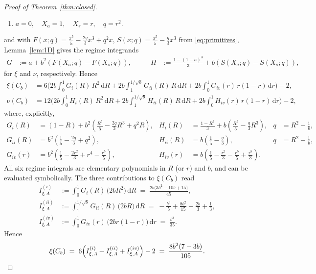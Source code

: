\documentclass{article}
\newcommand{\1}{\mathds{1}}
\newcommand{\de}{\mathrm{\,d}}
\begin{document}
\begin{proof}[Proof of Theorem~\ref{thm:closed}]
\begin{enumerate}[label=(\roman*)]
\item[(iv)] \(a = 0,\quad X_a = 1,\quad X_s = r,\quad q = r^{2}.\)
\end{enumerate}
and with \(F(x;q)=\frac{x^5}{5}-\frac{2q}{3}x^3+q^2x\), \(S(x;q)=\frac{x^5}{5}-\frac{q}{3}x^3\) from \eqref{eq:primitives}, Lemma~\ref{lem:1D} gives the regime integrands
\[
\begin{aligned}
G &:= a + b^2\!\left(F(X_a;q)-F(X_s;q)\right),
&\qquad
H &:= \frac{1-(1-a)^3}{3} + b\!\left(S(X_a;q)-S(X_s;q)\right),
\end{aligned}
\]
for \(\xi\) and \(\nu\), respectively. Hence
\[
\begin{aligned}
\xi(C_b)
&= 6\Bigg(
   2b\!\int_{0}^{1}\! G_i(R)\,R^2\de R
 + 2b\!\int_{1}^{1/\sqrt b}\! G_{ii}(R)\,R\de R
 + 2b\!\int_{0}^{1}\! G_{iv}(r)\,r(1-r)\de r
\Bigg) - 2,\\[4pt]
\nu(C_b)
&= 12\Bigg(
   2b\!\int_{0}^{1}\! H_i(R)\,R^2\de R
 + 2b\!\int_{1}^{1/\sqrt b}\! H_{ii}(R)\,R\de R
 + 2b\!\int_{0}^{1}\! H_{iv}(r)\,r(1-r)\de r
\Bigg) - 2,
\end{aligned}
\]
where, explicitly,
\[
\begin{aligned}
G_i(R)&=(1-R)+b^2\!\left(\frac{R^5}{5}-\frac{2q}{3}R^3+q^2R\right)\!,
& H_i(R)&=\frac{1-R^3}{3}+b\!\left(\frac{R^5}{5}-\frac{q}{3}R^3\right)\!,
& q&=R^2-\tfrac{1}{b},\\[3pt]
G_{ii}(R)&=b^2\!\left(\frac{1}{5}-\frac{2q}{3}+q^2\right)\!,
& H_{ii}(R)&=b\!\left(\frac{1}{5}-\frac{q}{3}\right)\!,
& q&=R^2-\tfrac{1}{b},\\[3pt]
G_{iv}(r)&=b^2\!\left(\frac{1}{5}-\frac{2r^2}{3}+r^4 - \frac{r^5}{5}\right)\!,
& H_{iv}(r)&=b\!\left(\frac{1}{5}-\frac{r^2}{3} - \frac{r^5}{5} + \frac{r^5}{3}\right)\!.
\end{aligned}
\]
All six regime integrals are elementary polynomials in \(R\) (or \(r\)) and \(b\), and can be evaluated symbolically. The three contributions to \(\xi(C_b)\) read
\[
\begin{aligned}
I^{(i)}_{\xi,A}
&:=\int_{0}^{1} G_i(R)\,\bigl(2bR^2\bigr)\de R
   \;=\; \frac{2b\bigl(3b^2-10b+15\bigr)}{45},\\[2mm]
I^{(ii)}_{\xi,A}
&:=\int_{1}^{1/\sqrt b} G_{ii}(R)\,\bigl(2bR\bigr)\de R
   \;=\; -\frac{b^3}{5}+\frac{8b^2}{15}-\frac{2b}{3}+\frac13,\\[2mm]
I^{(iv)}_{\xi,A}
&:=\int_{0}^{1} G_{iv}(r)\,\bigl(2br(1-r)\bigr)\de r
   \;=\; \frac{b^3}{35}.
\end{aligned}
\]
Hence
\[
\xi(C_b)
\;=\;
6\Bigl(I^{(i)}_{\xi,A}+I^{(ii)}_{\xi,A}+I^{(iv)}_{\xi,A}\Bigr)-2
\;=\;
\frac{8b^{2}(7-3b)}{105}.
\]


\end{proof}
\end{document}
